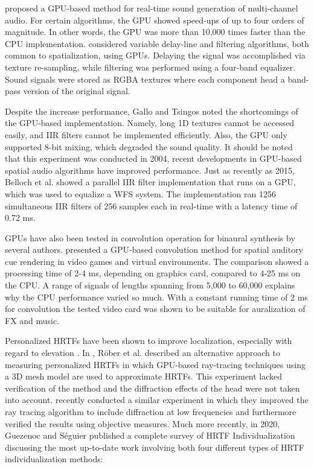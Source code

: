 \cite{trebien2008real} proposed a GPU-based method for real-time sound generation of multi-channel audio. For certain algorithms, the GPU showed speed-ups of up to four orders of magnitude. In other words, the GPU was more than 10,000 times faster than the CPU implementation. \cite{gallo2004efficient} considered variable delay-line and filtering algorithms, both common to spatialization, using GPUs. Delaying the signal was accomplished via texture re-sampling, while filtering was performed using a four-band equalizer. Sound signals were stored as RGBA textures where each component head a band-pass version of the original signal. 

Despite the increase performance, Gallo and Tsingos noted the shortcomings of the GPU-based implementation. Namely, long 1D textures cannot be accessed easily, and IIR filters cannot be implemented efficiently. Also, the GPU only supported 8-bit mixing, which degraded the sound quality. It should be noted that this experiment was conducted in 2004, recent developments in GPU-based spatial audio algorithms have improved performance. Just as recently as 2015, Belloch et al. \cite{belloch2014multi} showed a parallel IIR filter implementation that runs on a GPU, which was used to equalize a WFS system. The implementation ran 1256 simultaneous IIR filters of 256 samples each in real-time with a latency time of 0.72 ms.  

GPUs have also been tested in convolution operation for binaural synthesis by several authors. \cite{cowan2009real} presented a GPU-based convolution method for spatial auditory cue rendering in video games and virtual environments. The comparison showed a processing time of 2-4 ms, depending on graphics card, compared to 4-25 ms on the CPU. A range of signals of lengths spanning from 5,000 to 60,000 explains why the CPU performance varied so much. With a constant running time of 2 ms for convolution the tested video card was shown to be suitable for auralization of FX and music. 

Personalized HRTFs have been shown to improve localization, especially with regard to elevation \cite{kapralos2008virtual}. In \cite{rober2006hrtf}, Röber et al. described an alternative approach to measuring personalized HRTFs in which GPU-based ray-tracing techniques using a 3D mesh model are used to approximate HRTFs. This experiment lacked verification of the method and the diffraction effects of the head were not taken into account. \cite{sung2013individualized} recently conducted a similar experiment in which they improved the ray tracing algorithm to include diffraction at low frequencies and furthermore verified the results using objective measures. Much more recently, in 2020, Guezenoc and Séguier \cite{guezenoc2020hrtf} published a complete survey of HRTF Individualization discussing the most up-to-date work involving both four different types of HRTF individualization methods: 

